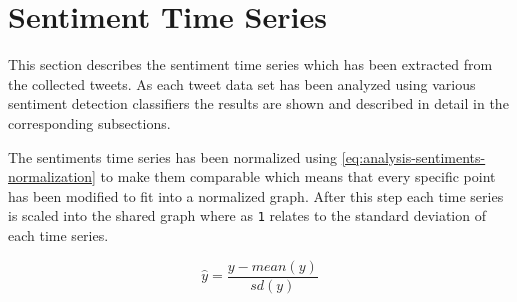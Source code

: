 
\section{Sentiment Time Series}
\label{s:analysis-sentiments}

This section describes the sentiment time series which has been extracted from the collected tweets.
As each tweet data set has been analyzed using various sentiment detection classifiers the results are shown and described in detail in the corresponding subsections.

The sentiments time series has been normalized using \cref{eq:analysis-sentiments-normalization} to make them comparable which means that every specific point has been modified to fit into a normalized graph.
After this step each time series is scaled into the shared graph where as \texttt{1} relates to the standard deviation of each time series.

\begin{equation}
    \hat{y} = \frac{y - mean(y)}{sd(y)}
    \label{eq:analysis-sentiments-normalization}
\end{equation}


